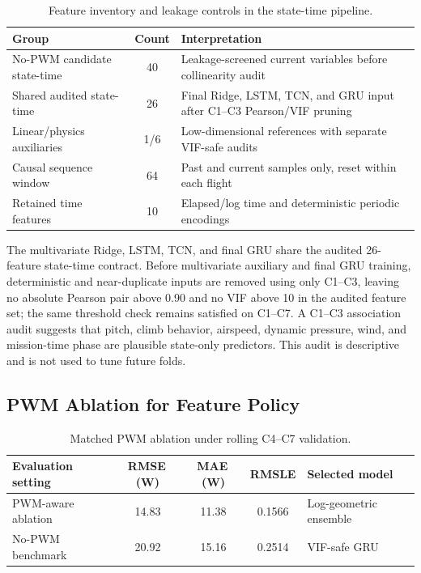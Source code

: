 \documentclass[runningheads,a4paper]{llncs}
\begin{document}
\begin{table}[!htbp]
\caption{Feature inventory and leakage controls in the state-time pipeline.}
\label{tab:features}
\centering
{\small
\begin{tabular}{lcp{7.1cm}}
\toprule
Group & Count & Interpretation \\
\midrule
No-PWM candidate state-time & 40 & Leakage-screened current variables before collinearity audit \\
Shared audited state-time & 26 & Final Ridge, LSTM, TCN, and GRU input after C1--C3 Pearson/VIF pruning \\
Linear/physics auxiliaries & 1/6 & Low-dimensional references with separate VIF-safe audits \\
Causal sequence window & 64 & Past and current samples only, reset within each flight \\
Retained time features & 10 & Elapsed/log time and deterministic periodic encodings \\
\bottomrule
\end{tabular}
}
\end{table}

The multivariate Ridge, LSTM, TCN, and final GRU share the audited 26-feature state-time contract. Before multivariate auxiliary and final GRU training, deterministic and near-duplicate inputs are removed using only C1--C3, leaving no absolute Pearson pair above 0.90 and no VIF above 10 in the audited feature set; the same threshold check remains satisfied on C1--C7. A C1--C3 association audit suggests that pitch, climb behavior, airspeed, dynamic pressure, wind, and mission-time phase are plausible state-only predictors. This audit is descriptive and is not used to tune future folds.

\subsection{PWM Ablation for Feature Policy}

\begin{table}[!htbp]
\caption{Matched PWM ablation under rolling C4--C7 validation.}
\label{tab:pwmablation}
\centering
{\small
\begin{tabular}{lcccl}
\toprule
Evaluation setting & RMSE\,(W) & MAE\,(W) & RMSLE & Selected model \\
\midrule
PWM-aware ablation & 14.83 & 11.38 & 0.1566 & Log-geometric ensemble \\
No-PWM benchmark & 20.92 & 15.16 & 0.2514 & VIF-safe GRU \\
\bottomrule
\end{tabular}
}
\end{table}
\end{document}
